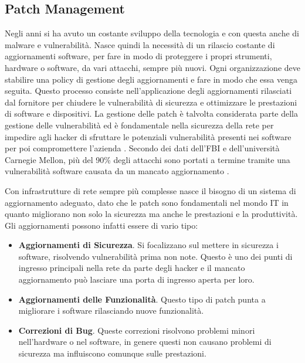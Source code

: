     \subsection{Patch Management}
        Negli anni si ha avuto un costante sviluppo della tecnologia e con questa anche di malware e vulnerabilità. Nasce quindi la necessità di un rilascio costante di aggiornamenti software, per fare in modo di proteggere i propri strumenti, hardware o software, da vari attacchi, sempre più nuovi. Ogni organizzazione deve stabilire una policy di gestione degli aggiornamenti e fare in modo che essa venga seguita. Questo processo consiste nell'applicazione degli aggiornamenti rilasciati dal fornitore per chiudere le vulnerabilità di sicurezza e ottimizzare le prestazioni di software e dispositivi. La gestione delle patch è talvolta considerata parte della gestione delle vulnerabilità ed è  fondamentale nella sicurezza della rete per impedire agli hacker di sfruttare le potenziali vulnerabilità presenti nei software per poi compromettere l'azienda \cite{ibm_patch_management_site}. Secondo dei dati dell'FBI e dell'università Carnegie Mellon, più del 90\% degli attacchi sono portati a termine tramite una vulnerabilità software causata da un mancato aggiornamento \cite{libro_patch_management}.

        Con infrastrutture di rete sempre più complesse nasce il bisogno di un sistema di aggiornamento adeguato, dato che le patch sono fondamentali nel mondo IT in quanto migliorano non solo la sicurezza ma anche le prestazioni e la produttività.
        Gli aggiornamenti possono infatti essere di vario tipo:
        \begin{itemize}
            \item \textbf{Aggiornamenti di Sicurezza}. Si focalizzano sul mettere in sicurezza i software, risolvendo vulnerabilità prima non note. Questo è uno dei punti di ingresso principali nella rete da parte degli hacker e il mancato aggiornamento può lasciare una porta di ingresso aperta per loro.
            \item \textbf{Aggiornamenti delle Funzionalità}. Questo tipo di patch punta a migliorare i software rilasciando nuove funzionalità.
            \item \textbf{Correzioni di Bug}. Queste correzioni risolvono problemi minori nell'hardware o nel software, in genere questi non causano problemi di sicurezza ma influiscono comunque sulle prestazioni.
        \end{itemize}

